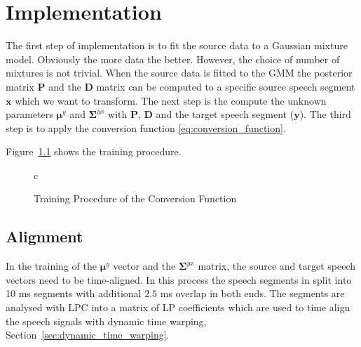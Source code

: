\chapter{Implementation} %
\label{cha:implementation}
The first step of implementation is to fit the source data to a Gaussian mixture model. Obviously the more data the better. However, the choice of number of mixtures is not trivial. When the source data is fitted to the GMM the posterior matrix $\mathbf{P}$ and the $\mathbf{D}$ matrix can be computed to a specific source speech segment $\mathbf{x}$ which we want to transform. The next step is the compute the unknown parameters $\boldsymbol{\mu}^y$ and $\mathbf{\Sigma}^{yx}$ with $\mathbf{P}$, $\mathbf{D}$ and the target speech segment ($\mathbf{y}$). The third step is to apply the conversion function \eqref{eq:conversion_function}.

Figure~\ref{fig:training_cf} shows the training procedure.
\begin{figure}[htbp]
  \centering
   \begin{tabular}[h]{c}
  \end{tabular}
  \caption{Training Procedure of the Conversion Function}
  \label{fig:training_cf}
\end{figure}

\section{Alignment} %
\label{sec:alignment}
In the training of the $\boldsymbol{\mu}^y$ vector and the $\mathbf{\Sigma}^{yx}$ matrix, the source and target speech vectors need to be time-aligned. In this process the speech segments in split into 10 ms segments with additional $2.5$ ms overlap in both ends. The segments are analysed with LPC into a matrix of LP coefficients which are used to time align the speech signals with dynamic time warping, Section~\ref{sec:dynamic_time_warping}.

